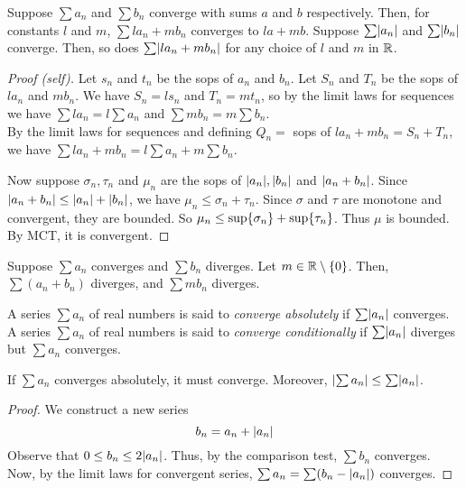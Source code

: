 \documentclass[12pt]{article}
\begin{document}
\begin{thm} \label{thm:series limit laws}
    Suppose $\sum a_{n}$ and $\sum b_{n}$ converge with sums $a$ and $b$ respectively. Then, for constants $l$ and $m$, $\sum la_{n} + mb_{n}$ converges to $la + mb$. Suppose $\sum \abs{ a_{n}}$ and $\sum \abs{ b_{n}}$ converge. Then, so does $\sum \abs{ la_{n} + mb_{n} }$ for any choice of $l$ and $m$ in $\mathbb{R}$.
\end{thm}
\begin{proof}[Proof \textcolor{red!70!black}{(self)}]
    Let $s_{n}$ and $t_{n}$ be the sops of $a_{n}$ and $b_{n}$. Let $S_{n}$ and $T_{n}$ be the sops of $la_{n}$ and $mb_{n}$. We have $S_{n} = l s_{n}$ and $T_{n} = m t_{n}$, so by the limit laws for sequences we have $\sum la_{n} = l \sum a_{n}$ and $\sum mb_{n} = m \sum b_{n}$. \\
    By the limit laws for sequences and defining $Q_{n} =$ sops of $la_{n} + mb_{n} = S_{n} + T_{n}$, we have $\sum la_{n} + mb_{n} = l \sum a_{n} + m \sum b_{n}$.

    Now suppose $\sigma_{n}, \tau_{n}$ and $\mu_{n}$ are the sops of $\abs{ a_{n}}, \abs{ b_{n}}$ and $\abs{ a_{n} + b_{n}}$. Since $\abs{ a_{n} + b_{n}} \leq \abs{ a_{n}} + \abs{ b_{n}}$, we have $\mu_{n} \leq \sigma_{n} + \tau_{n}$. Since $\sigma$ and $\tau$ are monotone and convergent, they are bounded. So $\mu_{n} \leq \sup \set{\sigma_{n}} + \sup \set{\tau_{n}}$. Thus $\mu$ is bounded. By MCT, it is convergent.
\end{proof}

\begin{cor} \label{cor:}
    Suppose $\sum a_{n}$ converges and $\sum b_{n}$ diverges. Let $m \in \R \setminus \set{0}$. Then, $\sum(a_{n} + b_{n})$ diverges, and $\sum mb_{n}$ diverges.
\end{cor}

\begin{defn} \label{defn:absolute convergence}
    A series $\sum a_{n}$ of real numbers is said to \emph{converge absolutely} if $\sum \abs{ a_{n}}$ converges. A series $\sum a_{n}$ of real numbers is said to \emph{converge conditionally} if $\sum \abs{ a_{n}}$ diverges but $\sum a_{n}$ converges.
\end{defn}
\begin{thm} \label{thm:}
    If $\sum a_{n}$ converges absolutely, it must converge. Moreover, $\abs{ \sum a_{n}} \leq \sum \abs{ a_{n}}$.
\end{thm}
\begin{proof}
    We construct a new series \[
        b_{n} = a_{n} + \abs{ a_{n}}
    \] Observe that $0 \leq  b_{n} \leq  2 \abs{  a_{n}  }$. Thus, by the comparison test, $\sum b_{n}$ converges. Now, by the limit laws for convergent series, $\sum a_{n} = \sum (b_{n} - \abs{ a_{n}})$ converges.
\end{proof}
\end{document}
